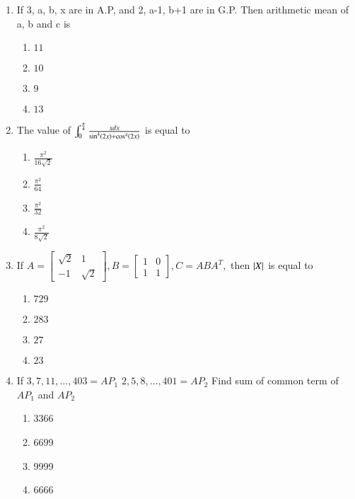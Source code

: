 \documentclass[journal,9pt,onecolumn]{IEEEtran}
\begin{document}
\begin{enumerate}


\item If 3, a, b, x are in A.P, and 2, a-1, b+1 are in G.P. Then arithmetic mean of a, b and c is
\begin{multicols}{4}
\begin{enumerate}
    \item $11$
    \item $10$
    \item $9$
    \item $13$
\end{enumerate}
\end{multicols}

\item The value of $\int_0^{\frac{\pi}{4}} \frac{xdx}{\sin ^4\left(2x\right) + \cos ^4\left(2x\right)}$ is equal to 
\begin{multicols}{4}
\begin{enumerate}
    \item $\frac{\pi ^2}{16\sqrt{2}}$
    \item $\frac{\pi ^2}{64}$
    \item $\frac{\pi ^2}{32}$
    \item $\frac{\pi ^2}{8\sqrt{2}}$
\end{enumerate}
\end{multicols}



\item If $A = \begin{bmatrix}\sqrt{2} & 1\\-1 & \sqrt{2}
\end{bmatrix}, B = \begin{bmatrix} 1 & 0\\1 & 1
\end{bmatrix}, C = ABA^T,$ then $\left\vert X\right\vert$ is equal to
\begin{multicols}{4}
\begin{enumerate}
    \item $729$ 
    \item $283$ 
    \item $27$ 
    \item $23$ 
\end{enumerate}
\end{multicols}



\item If $3, 7, 11, \ldots, 403 = AP_1\,\, 2, 5, 8, \ldots, 401 = AP_2$ Find sum of common term of $AP_1$ and $AP_2$
\begin{multicols}{4}
    \begin{enumerate}
        \item 3366
        \item 6699
        \item 9999
        \item 6666
    \end{enumerate}
\end{multicols}


\end{enumerate}
\end{document}
